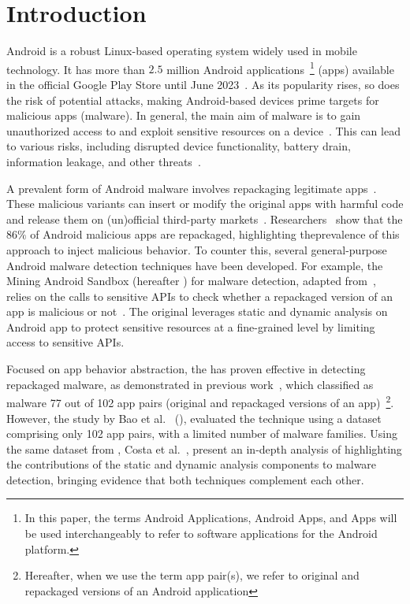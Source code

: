 \section{Introduction}\label{sec:introduction}


Android is a robust Linux-based operating system widely used in mobile technology. It has more than $2.5$ million Android applications~\footnote{In this paper, the terms Android Applications, Android Apps, and Apps will be used interchangeably to refer to software applications for the Android platform.} (apps) available in the official Google Play Store until June 2023~\cite{Statista}. As its popularity rises, so does the risk of potential attacks, making Android-based devices prime targets for malicious apps (malware). In general, the main aim of malware is to gain unauthorized access to and exploit sensitive resources on a device~\cite{DBLP:conf/ccs/FeltFCHW11,DBLP:journals/eswa/SurendranTE20}.
This can lead to various risks, including disrupted device functionality, battery drain, information leakage, and other threats~\cite{DBLP:conf/ccs/FeltFCHW11,DBLP:conf/sp/ZhouJ12}.

A prevalent form of Android malware involves repackaging legitimate apps~\cite{DBLP:conf/wcre/BaoLL18, le2018towards}. These malicious variants can insert or modify the original apps with harmful code and release them on (un)official third-party markets~\cite{DBLP:journals/tdsc/TianYRTP20}. Researchers~\cite{DBLP:journals/tdsc/TianYRTP20,DBLP:conf/sp/ZhouJ12,DBLP:journals/compsec/MerloRSV21} show that the $86\%$ of Android malicious apps are repackaged, highlighting theprevalence of this approach to inject malicious behavior. To counter this, several general-purpose Android malware detection techniques have been developed. For example, the Mining Android Sandbox (hereafter \mas) for malware detection, adapted from~\cite{DBLP:conf/icse/JamrozikSZ16}, relies on the calls to sensitive APIs to check whether a repackaged version of an app is malicious or not~\cite{DBLP:conf/wcre/BaoLL18,DBLP:jourals/jjc/Handrick22}. The original \mas leverages static and dynamic analysis on Android app to protect sensitive resources at a fine-grained level by limiting access to sensitive APIs.

Focused on app behavior abstraction, the \mas has proven effective in detecting repackaged malware, as demonstrated in previous work~\cite{DBLP:conf/wcre/BaoLL18}, which classified as malware 77 out of 102 app pairs (original and repackaged versions of an app)~\footnote{Hereafter, when we use the term app pair(s), we refer to original and repackaged versions of an Android application}. However, the study by Bao et al.~\cite{DBLP:conf/wcre/BaoLL18} (\blls), evaluated the technique using a dataset comprising only 102 app pairs, with a limited number of malware families. Using the same dataset from \blls, Costa et al.~\cite{DBLP:jourals/jjc/Handrick22}, present an in-depth analysis of \mas highlighting the contributions of the static and dynamic analysis components to malware detection, bringing evidence that both techniques complement each other. 

